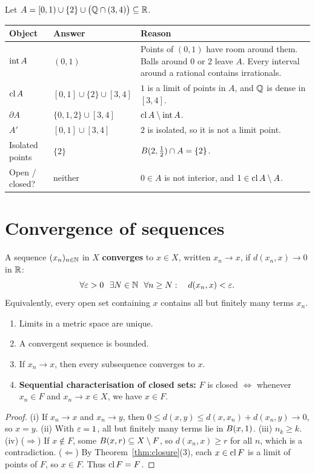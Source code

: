 \begin{example}\label{ex:compute}
Let $A=[0,1)\cup\{2\}\cup\bigl(\mathbb{Q}\cap(3,4)\bigr)\subseteq\mathbb{R}$.
\begin{center}
\renewcommand{\arraystretch}{1.2}
\begin{tabularx}{0.95\linewidth}{@{}llY@{}}
\toprule
Object & Answer & Reason \\
\midrule
$\operatorname{int} A$ & $(0,1)$ & Points of $(0,1)$ have room around them. Balls around $0$ or $2$ leave $A$. Every interval around a rational contains irrationals. \\
$\operatorname{cl} A$ & $[0,1]\cup\{2\}\cup[3,4]$ & $1$ is a limit of points in $A$, and $\mathbb{Q}$ is dense in $[3,4]$. \\
$\partial A$ & $\{0,1,2\}\cup[3,4]$ & $\operatorname{cl} A\setminus\operatorname{int} A$. \\
$A'$ & $[0,1]\cup[3,4]$ & $2$ is isolated, so it is not a limit point. \\
Isolated points & $\{2\}$ & $B(2,\tfrac12)\cap A=\{2\}$. \\
Open / closed? & neither & $0\in A$ is not interior, and $1\in\operatorname{cl} A\setminus A$. \\
\bottomrule
\end{tabularx}
\end{center}
\end{example}

\section{Convergence of sequences}
\begin{definition}[Convergence]\label{def:conv}
A sequence $(x_n)_{n\in\mathbb{N}}$ in $X$ \textbf{converges} to $x\in X$, written $x_n\to x$, if $d(x_n,x)\to0$ in $\mathbb{R}$:
\[
  \forall\varepsilon>0\ \ \exists N\in\mathbb{N}\ \ \forall n\ge N:\quad d(x_n,x)<\varepsilon .
\]
Equivalently, every open set containing $x$ contains all but finitely many terms $x_n$.
\end{definition}

\begin{theorem}\label{thm:seqfacts}
\leavevmode
\begin{enumerate}[label=(\roman*)]
  \item Limits in a metric space are unique.
  \item A convergent sequence is bounded.
  \item If $x_n\to x$, then every subsequence converges to $x$.
  \item \textbf{Sequential characterisation of closed sets:} $F$ is closed $\iff$ whenever $x_n\in F$ and $x_n\to x\in X$, we have $x\in F$.
\end{enumerate}
\end{theorem}
\begin{proof}
(i) If $x_n\to x$ and $x_n\to y$, then $0\le d(x,y)\le d(x,x_n)+d(x_n,y)\to0$, so $x=y$.
(ii) With $\varepsilon=1$, all but finitely many terms lie in $B(x,1)$.
(iii) $n_k\ge k$.
(iv) ($\Rightarrow$) If $x\notin F$, some $B(x,r)\subseteq X\setminus F$, so $d(x_n,x)\ge r$ for all $n$, which is a contradiction. ($\Leftarrow$) By Theorem~\ref{thm:closure}(3), each $x\in\operatorname{cl} F$ is a limit of points of $F$, so $x\in F$. Thus $\operatorname{cl} F=F$.
\end{proof}

